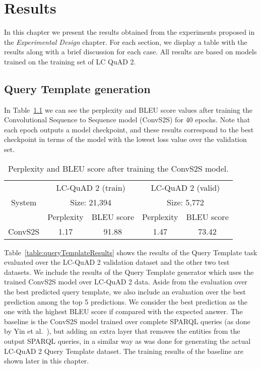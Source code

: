 \chapter{Results}
\label{cap5:results}
In this chapter we present the results obtained from the experiments proposed in the 
\textit{Experimental Design} chapter. For each section, we display a table with the results 
along with a brief discussion for each case. All results are based on models trained on the 
training set of LC QuAD 2.

\section{Query Template generation}
\label{cap5:results/queryTemplate}
In Table~\ref{table:queryTemplateTraining} we can see the perplexity and BLEU score values after 
training the Convolutional Sequence to Sequence model (ConvS2S) for 40 epochs. Note that each 
epoch outputs a model checkpoint, and these results correspond to the best checkpoint in terms 
of the model with the lowest loss value over the validation set.

\begin{table}[h!]
    \centering
    \begin{tabular}{|c|cc|cc|}
        \hline
        \multirow{3}{*}{System} & \multicolumn{2}{c|}{LC-QuAD 2 (train)}       & \multicolumn{2}{c|}{LC-QuAD 2 (valid)}       \\ \cline{2-5} 
                                & \multicolumn{2}{c|}{Size: 21,394}            & \multicolumn{2}{c|}{Size: 5,772}             \\ \cline{2-5} 
                                & \multicolumn{1}{c|}{Perplexity} & BLEU score & \multicolumn{1}{c|}{Perplexity} & BLEU score \\ \hline
        ConvS2S                 & 1.17                            & 91.88      & 1.47                            & 73.42      \\ \hline
    \end{tabular}
    \caption{Perplexity and BLEU score after training the ConvS2S model.}
    \label{table:queryTemplateTraining}
\end{table}

Table~\ref{table:queryTemplateResults} shows the results of the Query Template task evaluated 
over the LC-QuAD 2 validation dataset and the other two test datasets. We include the results of 
the Query Template generator which uses the trained ConvS2S model over LC-QuAD 2 data. Aside 
from the evaluation over the best predicted query template, we also include an evaluation over 
the best prediction among the top 5 predictions. We consider the best prediction as the one with 
the highest BLEU score if compared with the expected answer. The baseline is the ConvS2S model 
trained over complete SPARQL queries (as done by Yin et al.~\cite{nmt:nl-to-sparql-Yin19}), but 
adding an extra layer that removes the entities from the output SPARQL queries, in a similar way 
as was done for generating the actual LC-QuAD 2 Query Template dataset. The training results of 
the baseline are shown later in this chapter.

